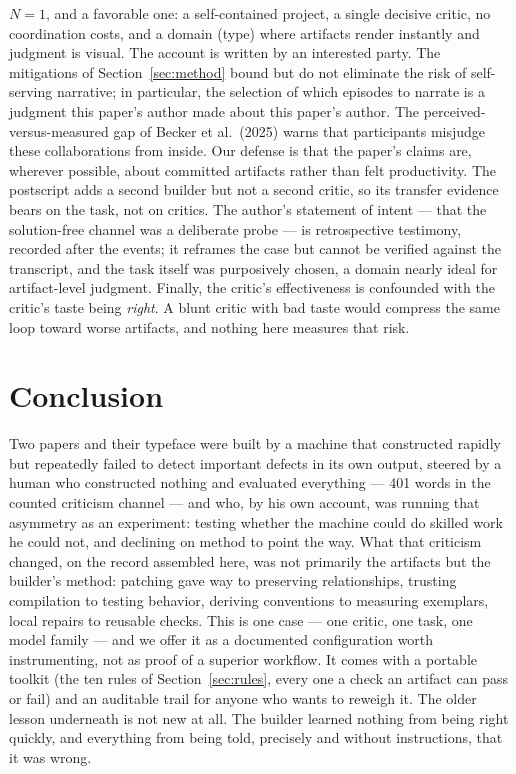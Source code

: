 \documentclass[12pt]{article}
\begin{document}
$N{=}1$, and a favorable one: a self-contained project, a single decisive critic, no coordination costs, and a domain (type) where artifacts render instantly and judgment is visual. The account is written by an interested party. The mitigations of Section~\ref{sec:method} bound but do not eliminate the risk of self-serving narrative; in particular, the selection of which episodes to narrate is a judgment this paper's author made about this paper's author. The perceived-versus-measured gap of Becker et al.\ (2025) warns that participants misjudge these collaborations from inside. Our defense is that the paper's claims are, wherever possible, about committed artifacts rather than felt productivity. The postscript adds a second builder but not a second critic, so its transfer evidence bears on the task, not on critics. The author's statement of intent — that the solution-free channel was a deliberate probe — is retrospective testimony, recorded after the events; it reframes the case but cannot be verified against the transcript, and the task itself was purposively chosen, a domain nearly ideal for artifact-level judgment. Finally, the critic's effectiveness is confounded with the critic's taste being \emph{right}. A blunt critic with bad taste would compress the same loop toward worse artifacts, and nothing here measures that risk.

\section{Conclusion}

Two papers and their typeface were built by a machine that constructed rapidly but repeatedly failed to detect important defects in its own output, steered by a human who constructed nothing and evaluated everything — 401 words in the counted criticism channel — and who, by his own account, was running that asymmetry as an experiment: testing whether the machine could do skilled work he could not, and declining on method to point the way. What that criticism changed, on the record assembled here, was not primarily the artifacts but the builder's method: patching gave way to preserving relationships, trusting compilation to testing behavior, deriving conventions to measuring exemplars, local repairs to reusable checks. This is one case — one critic, one task, one model family — and we offer it as a documented configuration worth instrumenting, not as proof of a superior workflow. It comes with a portable toolkit (the ten rules of Section~\ref{sec:rules}, every one a check an artifact can pass or fail) and an auditable trail for anyone who wants to reweigh it. The older lesson underneath is not new at all. The builder learned nothing from being right quickly, and everything from being told, precisely and without instructions, that it was wrong.
\end{document}
